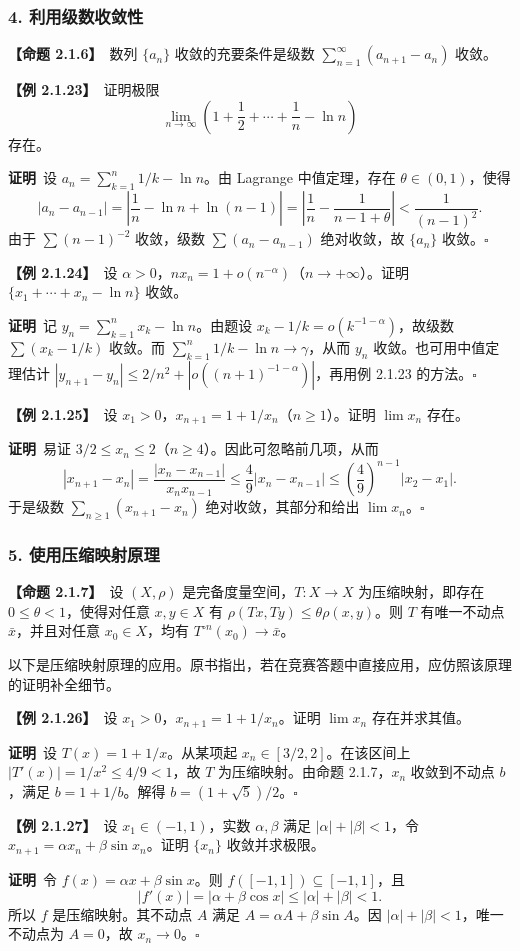 \documentclass[UTF8,a4paper,11pt]{ctexart}
\newcommand{\ex}[1]{\par\medskip\noindent\textbf{【例 #1】}\ }
\newcommand{\prop}[1]{\par\medskip\noindent\textbf{【命题 #1】}\ }
\newcommand{\pf}{\par\noindent\textbf{证明}\ }
\begin{document}
\subsubsection*{4. 利用级数收敛性}
\prop{2.1.6}数列 $\{a_n\}$ 收敛的充要条件是级数 $\sum_{n=1}^{\infty}(a_{n+1}-a_n)$ 收敛。

\ex{2.1.23}证明极限
\[
\lim_{n\to\infty}\left(1+\frac12+\cdots+\frac1n-\ln n\right)
\]
存在。
\pf 设 $a_n=\sum_{k=1}^{n}1/k-\ln n$。由 Lagrange 中值定理，存在 $\theta\in(0,1)$，使得
\[
|a_n-a_{n-1}|=\left|\frac1n-\ln n+\ln(n-1)\right|
=\left|\frac1n-\frac1{n-1+\theta}\right|
<\frac1{(n-1)^2}.
\]
由于 $\sum(n-1)^{-2}$ 收敛，级数 $\sum(a_n-a_{n-1})$ 绝对收敛，故 $\{a_n\}$ 收敛。\hfill$\square$

\ex{2.1.24}设 $\alpha>0$，$nx_n=1+o(n^{-\alpha})$（$n\to+\infty$）。证明 $\{x_1+\cdots+x_n-\ln n\}$ 收敛。
\pf 记 $y_n=\sum_{k=1}^{n}x_k-\ln n$。由题设 $x_k-1/k=o(k^{-1-\alpha})$，故级数 $\sum(x_k-1/k)$ 收敛。而 $\sum_{k=1}^{n}1/k-\ln n\to\gamma$，从而 $y_n$ 收敛。也可用中值定理估计 $|y_{n+1}-y_n|\le2/n^2+|o((n+1)^{-1-\alpha})|$，再用例 2.1.23 的方法。\hfill$\square$

\ex{2.1.25}设 $x_1>0$，$x_{n+1}=1+1/x_n$（$n\ge1$）。证明 $\lim x_n$ 存在。
\pf 易证 $3/2\le x_n\le2$（$n\ge4$）。因此可忽略前几项，从而
\[
|x_{n+1}-x_n|=\frac{|x_n-x_{n-1}|}{x_nx_{n-1}}
\le\frac49|x_n-x_{n-1}|
\le\left(\frac49\right)^{n-1}|x_2-x_1|.
\]
于是级数 $\sum_{n\ge1}(x_{n+1}-x_n)$ 绝对收敛，其部分和给出 $\lim x_n$。\hfill$\square$

\subsubsection*{5. 使用压缩映射原理}
\prop{2.1.7}设 $(X,\rho)$ 是完备度量空间，$T:X\to X$ 为压缩映射，即存在 $0\le\theta<1$，使得对任意 $x,y\in X$ 有 $\rho(Tx,Ty)\le\theta\rho(x,y)$。则 $T$ 有唯一不动点 $\bar x$，并且对任意 $x_0\in X$，均有 $T^{\circ n}(x_0)\to\bar x$。

以下是压缩映射原理的应用。原书指出，若在竞赛答题中直接应用，应仿照该原理的证明补全细节。

\ex{2.1.26}设 $x_1>0$，$x_{n+1}=1+1/x_n$。证明 $\lim x_n$ 存在并求其值。
\pf 设 $T(x)=1+1/x$。从某项起 $x_n\in[3/2,2]$。在该区间上 $|T'(x)|=1/x^2\le4/9<1$，故 $T$ 为压缩映射。由命题 2.1.7，$x_n$ 收敛到不动点 $b$，满足 $b=1+1/b$。解得 $b=(1+\sqrt5)/2$。\hfill$\square$

\ex{2.1.27}设 $x_1\in(-1,1)$，实数 $\alpha,\beta$ 满足 $|\alpha|+|\beta|<1$，令 $x_{n+1}=\alpha x_n+\beta\sin x_n$。证明 $\{x_n\}$ 收敛并求极限。
\pf 令 $f(x)=\alpha x+\beta\sin x$。则 $f([-1,1])\subseteq[-1,1]$，且
\[
|f'(x)|=|\alpha+\beta\cos x|\le|\alpha|+|\beta|<1.
\]
所以 $f$ 是压缩映射。其不动点 $A$ 满足 $A=\alpha A+\beta\sin A$。因 $|\alpha|+|\beta|<1$，唯一不动点为 $A=0$，故 $x_n\to0$。\hfill$\square$
\end{document}
